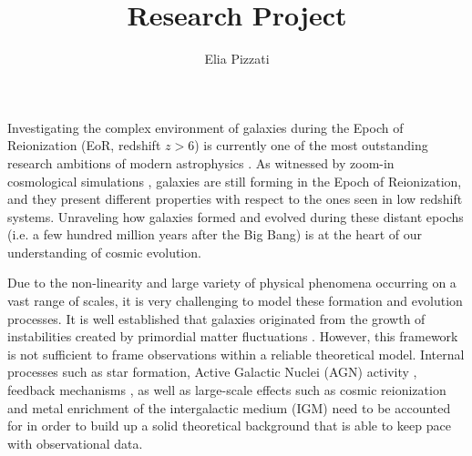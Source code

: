 \documentclass[12pt]{article}
\title{Research Project}
\author{Elia Pizzati}
\date{\vspace{-8pt}}
\begin{document}
\maketitle



%
%
%
%
%
%
%
%


Investigating the complex environment of galaxies during the Epoch of Reionization (EoR, redshift $z>6$) is currently one of the most outstanding research ambitions of modern astrophysics \citep{Dayal:2018hft, Barkana:2000fd}. As witnessed by zoom-in cosmological simulations \citep{Murali_2002,somerville2015,Vogelsberger:2019ynw}, galaxies are still forming in the Epoch of Reionization, and they present different properties with respect to the ones seen in low redshift systems. Unraveling how galaxies formed and evolved during these distant epochs (i.e. a few hundred million years after the Big Bang) is at the heart of our understanding of cosmic evolution.

Due to the non-linearity and large variety of physical phenomena occurring on a vast range of scales, it is very challenging to model these formation and evolution processes. It is well established that galaxies originated from the growth of instabilities created by primordial matter fluctuations \citep{bertschinger98}. However, this framework is not sufficient to frame observations within a reliable theoretical model. Internal processes such as star formation, Active Galactic Nuclei (AGN) activity \citep{Kormendy:2013dxa, morganti2017archaeology}, feedback mechanisms \citep{fabian12}, as well as large-scale effects such as cosmic reionization \citep{mesinger_2016} and metal enrichment of the intergalactic medium (IGM) \citep{Aguirre:2001ay} need to be accounted for in order to build up a solid theoretical background that is able to keep pace with observational data.
\end{document}
